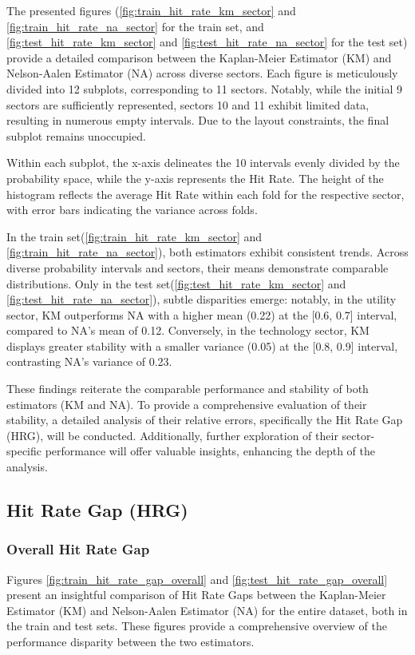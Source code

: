 The presented figures (\ref{fig:train_hit_rate_km_sector} and \ref{fig:train_hit_rate_na_sector} for the train set, and \ref{fig:test_hit_rate_km_sector} and \ref{fig:test_hit_rate_na_sector} for the test set) provide a detailed comparison between the Kaplan-Meier Estimator (KM) and Nelson-Aalen Estimator (NA) across diverse sectors. Each figure is meticulously divided into 12 subplots, corresponding to 11 sectors. Notably, while the initial 9 sectors are sufficiently represented, sectors 10 and 11 exhibit limited data, resulting in numerous empty intervals. Due to the layout constraints, the final subplot remains unoccupied.

Within each subplot, the x-axis delineates the 10 intervals evenly divided by the probability space, while the y-axis represents the Hit Rate. The height of the histogram reflects the average Hit Rate within each fold for the respective sector, with error bars indicating the variance across folds.

In the train set(\ref{fig:train_hit_rate_km_sector} and \ref{fig:train_hit_rate_na_sector}), both estimators exhibit consistent trends. Across diverse probability intervals and sectors, their means demonstrate comparable distributions. Only in the test set(\ref{fig:test_hit_rate_km_sector} and \ref{fig:test_hit_rate_na_sector}), subtle disparities emerge: notably, in the utility sector, KM outperforms NA with a higher mean (0.22) at the [0.6, 0.7] interval, compared to NA's mean of 0.12. Conversely, in the technology sector, KM displays greater stability with a smaller variance (0.05) at the [0.8, 0.9] interval, contrasting NA's variance of 0.23.

These findings reiterate the comparable performance and stability of both estimators (KM and NA). To provide a comprehensive evaluation of their stability, a detailed analysis of their relative errors, specifically the Hit Rate Gap (HRG), will be conducted. Additionally, further exploration of their sector-specific performance will offer valuable insights, enhancing the depth of the analysis.

\subsection{Hit Rate Gap (HRG)}
\subsubsection{Overall Hit Rate Gap}
Figures \ref{fig:train_hit_rate_gap_overall} and \ref{fig:test_hit_rate_gap_overall} present an insightful comparison of Hit Rate Gaps between the Kaplan-Meier Estimator (KM) and Nelson-Aalen Estimator (NA) for the entire dataset, both in the train and test sets. These figures provide a comprehensive overview of the performance disparity between the two estimators.

